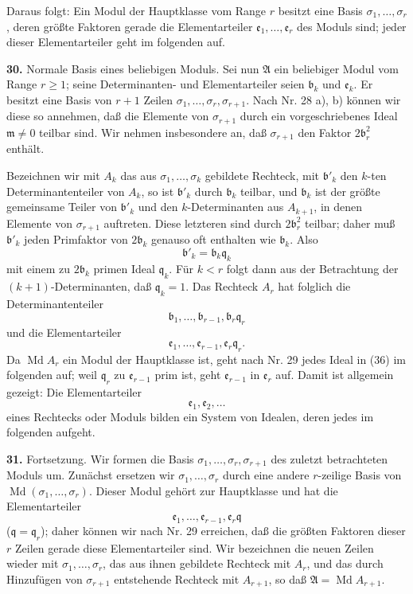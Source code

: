 \documentclass[11pt,a4paper]{article}
\begin{document}
Daraus folgt: Ein Modul der Hauptklasse vom Range \(r\) besitzt eine Basis \(\sigma_1,\ldots,\sigma_r\), deren größte Faktoren gerade die Elementarteiler \(\mathfrak e_1,\ldots,\mathfrak e_r\) des Moduls sind; jeder dieser Elementarteiler geht im folgenden auf.

\textbf{30.} Normale Basis eines beliebigen Moduls. Sei nun \(\mathfrak A\) ein beliebiger Modul vom Range \(r\ge1\); seine Determinanten- und Elementarteiler seien \(\mathfrak b_k\) und \(\mathfrak e_k\). Er besitzt eine Basis von \(r+1\) Zeilen \(\sigma_1,\ldots,\sigma_r,\sigma_{r+1}\). Nach Nr. 28 a), b) können wir diese so annehmen, daß die Elemente von \(\sigma_{r+1}\) durch ein vorgeschriebenes Ideal \(\mathfrak m\ne0\) teilbar sind. Wir nehmen insbesondere an, daß \(\sigma_{r+1}\) den Faktor \(2\mathfrak b_r^2\) enthält.

Bezeichnen wir mit \(A_k\) das aus \(\sigma_1,\ldots,\sigma_k\) gebildete Rechteck, mit \(\mathfrak b'_k\) den \(k\)-ten Determinantenteiler von \(A_k\), so ist \(\mathfrak b'_k\) durch \(\mathfrak b_k\) teilbar, und \(\mathfrak b_k\) ist der größte gemeinsame Teiler von \(\mathfrak b'_k\) und den \(k\)-Determinanten aus \(A_{k+1}\), in denen Elemente von \(\sigma_{r+1}\) auftreten. Diese letzteren sind durch \(2\mathfrak b_r^2\) teilbar; daher muß \(\mathfrak b'_k\) jeden Primfaktor von \(2\mathfrak b_k\) genauso oft enthalten wie \(\mathfrak b_k\). Also
\[
 \mathfrak b'_k=\mathfrak b_k\mathfrak q_k
\]
mit einem zu \(2\mathfrak b_k\) primen Ideal \(\mathfrak q_k\). Für \(k<r\) folgt dann aus der Betrachtung der \((k+1)\)-Determinanten, daß \(\mathfrak q_k=1\). Das Rechteck \(A_r\) hat folglich die Determinantenteiler
\[
 \mathfrak b_1,\ldots,\mathfrak b_{r-1},\mathfrak b_r\mathfrak q_r
\]
und die Elementarteiler
\[
 \mathfrak e_1,\ldots,\mathfrak e_{r-1},\mathfrak e_r\mathfrak q_r. \tag{36}
\]
Da \(\operatorname{Md}A_r\) ein Modul der Hauptklasse ist, geht nach Nr. 29 jedes Ideal in (36) im folgenden auf; weil \(\mathfrak q_r\) zu \(\mathfrak e_{r-1}\) prim ist, geht \(\mathfrak e_{r-1}\) in \(\mathfrak e_r\) auf. Damit ist allgemein gezeigt: Die Elementarteiler
\[
 \mathfrak e_1,\mathfrak e_2,\ldots
\]
eines Rechtecks oder Moduls bilden ein System von Idealen, deren jedes im folgenden aufgeht.

\textbf{31.} Fortsetzung. Wir formen die Basis \(\sigma_1,\ldots,\sigma_r,\sigma_{r+1}\) des zuletzt betrachteten Moduls um. Zunächst ersetzen wir \(\sigma_1,\ldots,\sigma_r\) durch eine andere \(r\)-zeilige Basis von \(\operatorname{Md}(\sigma_1,\ldots,\sigma_r)\). Dieser Modul gehört zur Hauptklasse und hat die Elementarteiler
\[
 \mathfrak e_1,\ldots,\mathfrak e_{r-1},\mathfrak e_r\mathfrak q
\]
(\(\mathfrak q=\mathfrak q_r\)); daher können wir nach Nr. 29 erreichen, daß die größten Faktoren dieser \(r\) Zeilen gerade diese Elementarteiler sind. Wir bezeichnen die neuen Zeilen wieder mit \(\sigma_1,\ldots,\sigma_r\), das aus ihnen gebildete Rechteck mit \(A_r\), und das durch Hinzufügen von \(\sigma_{r+1}\) entstehende Rechteck mit \(A_{r+1}\), so daß \(\mathfrak A=\operatorname{Md}A_{r+1}\).
\end{document}
